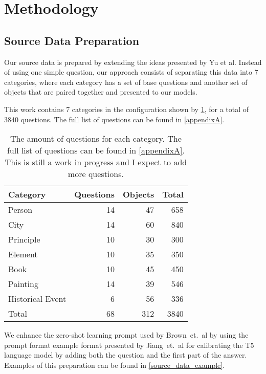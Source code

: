 \section{Methodology}

\newcommand{\cats}{7}
\newcommand{\baseqs}{68}
\newcommand{\things}{312}
\newcommand{\qs}{3840}

\subsection{Source Data Preparation}

Our source data is prepared by extending the ideas presented by Yu et al\cite{factual_recall}.
Instead of using one simple question, our approach consists of separating this data into \cats{} categories, where each category has a set of base questions and another set of objects that are paired together and presented to our models.

This work contains \cats{} categories in the configuration shown by \cref{categories_numbers}, for a total of \qs{} questions.
The full list of questions can be found in \cref{appendixA}.

\begin{table}[h]
	\centering
	\scriptsize
	\begin{tabular}{l | r r r}
		\toprule
			\bfseries Category & \bfseries Questions & \bfseries Objects & \bfseries Total \\
		\midrule
			Person           & 14 &  47 &  658 \\
			City             & 14 &  60 &  840 \\
			Principle        & 10 &  30 &  300 \\
			Element          & 10 &  35 &  350 \\
			Book             & 10 &  45 &  450 \\
			Painting         & 14 &  39 &  546 \\
			Historical Event & 6  &  56 &  336 \\
		\midrule
			Total & \baseqs{} & \things{} & \qs{} \\
		\bottomrule
	\end{tabular}
	\caption{The amount of questions for each category. The full list of questions can be found in \cref{appendixA}. This is still a work in progress and I expect to add more questions.}
	\label{categories_numbers}
\end{table}

We enhance the zero-shot learning prompt used by Brown~et.~al\cite{fewshotlearners} by using the prompt format example format presented by Jiang~et.~al\cite{how_can_we_know} for calibrating the T5 language model by adding both the question and the first part of the answer.
Examples of this preparation can be found in \cref{source_data_example}.

